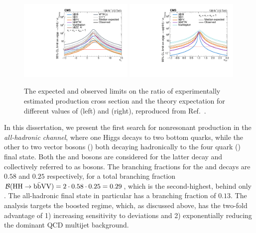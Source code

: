 \begin{figure}[htb!]
    \centering
    \includegraphics[width=0.49\textwidth]{figures/05-HH/CMS-results/kl_limits_channels_r_paper.pdf}
    \includegraphics[width=0.49\textwidth]{figures/05-HH/CMS-results/C2V_limits_channels_rqqHH_paper.pdf}
    \caption[The expected and observed limits on the ratio of experimentally estimated production cross section and the theory expectation.]{The expected and observed limits on the ratio of experimentally estimated production cross section and the theory expectation for different values of \kapl (left) and \kapvv (right), reproduced from Ref.~\cite{CMS-PAS-HIG-20-011}.}
    \label{fig:05_hh_comb_kappa}
\end{figure}


In this dissertation, we present the first search for nonresonant \HH production in the \textit{all-hadronic \bbvv channel}, where one Higgs decays to two bottom quarks, while the other to two vector bosons (\VV) both decaying hadronically to the four quark (\qqqq) final state.
Both the \PW and \PZ bosons are considered for the latter decay and collectively referred to as \PV bosons.
The branching fractions for the \bbbar and \VV decays are $0.58$ and $0.25$ respectively, for a total branching fraction $\mathcal{B}({\textrm{H}\textrm{H}\to\textrm{b}\bar{\textrm{b}}\textrm{V}\textrm{V}}) = 2  \cdot0.58\cdot 0.25 = 0.29$, which is the second-highest, behind only \bbbb. 
The all-hadronic final state in particular has a branching fraction of $0.13$. 
The analysis targets the boosted regime, which, as discussed above, has the two-fold advantage of 1) increasing sensitivity to \kapvv deviations and 2) exponentially reducing the dominant QCD multijet background.



